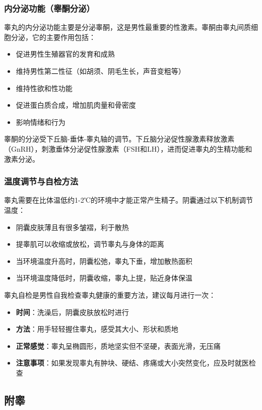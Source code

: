 \subsubsection{内分泌功能（睾酮分泌）}

睾丸的内分泌功能主要是分泌睾酮，这是男性最重要的性激素。睾酮由睾丸间质细胞分泌，它的主要作用包括：
\begin{itemize}
    \item 促进男性生殖器官的发育和成熟
    \item 维持男性第二性征（如胡须、阴毛生长，声音变粗等）
    \item 维持性欲和性功能
    \item 促进蛋白质合成，增加肌肉量和骨密度
    \item 影响情绪和行为
\end{itemize}

睾酮的分泌受下丘脑-垂体-睾丸轴的调节。下丘脑分泌促性腺激素释放激素（GnRH），刺激垂体分泌促性腺激素（FSH和LH），进而促进睾丸的生精功能和激素分泌。

\subsubsection{温度调节与自检方法}

睾丸需要在比体温低约1-2℃的环境中才能正常产生精子。阴囊通过以下机制调节温度：
\begin{itemize}
    \item 阴囊皮肤薄且有很多皱褶，利于散热
    \item 提睾肌可以收缩或放松，调节睾丸与身体的距离
    \item 当环境温度升高时，阴囊松弛，睾丸下垂，增加散热面积
    \item 当环境温度降低时，阴囊收缩，睾丸上提，贴近身体保温
\end{itemize}

睾丸自检是男性自我检查睾丸健康的重要方法，建议每月进行一次：
\begin{itemize}
    \item \textbf{时间}：洗澡后，阴囊皮肤放松时进行
    \item \textbf{方法}：用手轻轻握住睾丸，感受其大小、形状和质地
    \item \textbf{正常感觉}：睾丸呈椭圆形，质地坚实但不坚硬，表面光滑，无压痛
    \item \textbf{注意事项}：如果发现睾丸有肿块、硬结、疼痛或大小突然变化，应及时就医检查
\end{itemize}

\subsection{附睾}


